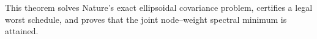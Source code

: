 This theorem solves Nature's exact ellipsoidal covariance problem, certifies a legal worst schedule, and proves that the joint node--weight spectral minimum is attained.